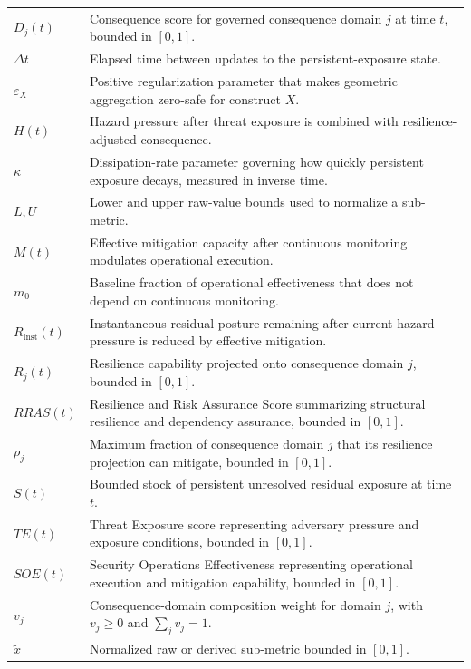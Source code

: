 \documentclass[11pt]{article}
\begin{document}
\begin{longtable}{p{} p{}}
  $D_j(t)$ & Consequence score for governed consequence domain $j$ at time $t$, bounded in $[0,1]$. \\
  $\Delta t$ & Elapsed time between updates to the persistent-exposure state. \\
  $\varepsilon_X$ & Positive regularization parameter that makes geometric aggregation zero-safe for construct $X$. \\
  $H(t)$ & Hazard pressure after threat exposure is combined with resilience-adjusted consequence. \\
  $\kappa$ & Dissipation-rate parameter governing how quickly persistent exposure decays, measured in inverse time. \\
  $L,U$ & Lower and upper raw-value bounds used to normalize a sub-metric. \\
  $M(t)$ & Effective mitigation capacity after continuous monitoring modulates operational execution. \\
  $m_0$ & Baseline fraction of operational effectiveness that does not depend on continuous monitoring. \\
  $R_{\mathrm{inst}}(t)$ & Instantaneous residual posture remaining after current hazard pressure is reduced by effective mitigation. \\
  $R_j(t)$ & Resilience capability projected onto consequence domain $j$, bounded in $[0,1]$. \\
  $RRAS(t)$ & Resilience and Risk Assurance Score summarizing structural resilience and dependency assurance, bounded in $[0,1]$. \\
  $\rho_j$ & Maximum fraction of consequence domain $j$ that its resilience projection can mitigate, bounded in $[0,1]$. \\
  $S(t)$ & Bounded stock of persistent unresolved residual exposure at time $t$. \\
  $TE(t)$ & Threat Exposure score representing adversary pressure and exposure conditions, bounded in $[0,1]$. \\
  $SOE(t)$ & Security Operations Effectiveness representing operational execution and mitigation capability, bounded in $[0,1]$. \\
  $v_j$ & Consequence-domain composition weight for domain $j$, with $v_j\geq0$ and $\sum_j v_j=1$. \\
  $\widetilde{x}$ & Normalized raw or derived sub-metric bounded in $[0,1]$. \\
  \bottomrule
\end{longtable}
\end{document}

